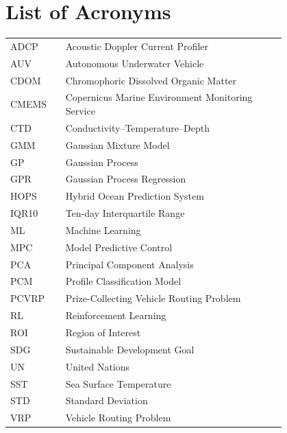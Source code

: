 \chapter*{List of Acronyms}

\begin{flushleft}
\begin{tabular}{l p{0.8\linewidth}}
ADCP   & Acoustic Doppler Current Profiler\\
AUV    & Autonomous Underwater Vehicle\\
CDOM   & Chromophoric Dissolved Organic Matter\\
CMEMS  & Copernicus Marine Environment Monitoring Service\\
CTD    & Conductivity--Temperature--Depth\\
GMM    & Gaussian Mixture Model\\
GP     & Gaussian Process\\
GPR    & Gaussian Process Regression\\
HOPS   & Hybrid Ocean Prediction System\\
IQR10  & Ten-day Interquartile Range\\
ML     & Machine Learning\\
MPC    & Model Predictive Control\\
PCA    & Principal Component Analysis\\
PCM    & Profile Classification Model\\
PCVRP  & Prize-Collecting Vehicle Routing Problem\\
RL     & Reinforcement Learning\\
ROI    & Region of Interest\\
SDG    & Sustainable Development Goal\\
UN     & United Nations\\
SST    & Sea Surface Temperature\\
STD    & Standard Deviation\\
VRP    & Vehicle Routing Problem\\
\end{tabular}
\end{flushleft}
